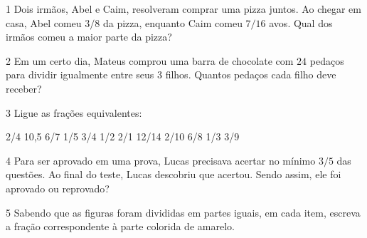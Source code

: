 {

\num{1}  Dois irmãos, Abel e Caim, resolveram comprar uma pizza juntos. Ao
chegar em casa, Abel comeu $3/8$ da pizza, enquanto Caim comeu $7/16$ avos.
Qual dos irmãos comeu a maior parte da pizza?


\num{2}  Em um certo dia, Mateus comprou uma barra de chocolate com $24$ pedaços
para dividir igualmente entre seus $3$ filhos. Quantos pedaços cada filho
deve receber?



\num{3}  Ligue as frações equivalentes:

\begin{mdframed}[linewidth=2pt,linecolor=azul!20,backgroundcolor=azul!20,roundcorner=2pt]
2/4 \hfill 10,5    
6/7 \hfill 1/5    
3/4 \hfill 1/2    
2/1 \hfill 12/14    
2/10 \hfill 6/8    
1/3 \hfill 3/9    
\end{mdframed}


\num{4}  Para ser aprovado em uma prova, Lucas precisava acertar no mínimo $3/5$
das questões. Ao final do teste, Lucas descobriu que acertou. Sendo
assim, ele foi aprovado ou reprovado?


\num{5}  Sabendo que as figuras foram divididas em partes iguais, em cada
item, escreva a fração correspondente à parte colorida de amarelo.

}
